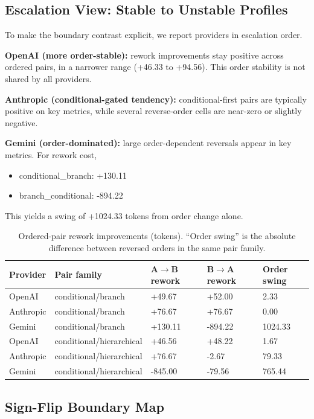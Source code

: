 \documentclass[11pt,a4paper]{article}
\begin{document}
\subsection{Escalation View: Stable to Unstable Profiles}

To make the boundary contrast explicit, we report providers in escalation order.

\textbf{OpenAI (more order-stable):}
rework improvements stay positive across ordered pairs, in a narrower range (+46.33 to +94.56).
This order stability is not shared by all providers.

\textbf{Anthropic (conditional-gated tendency):}
conditional-first pairs are typically positive on key metrics, while several reverse-order cells are near-zero or slightly negative.

\textbf{Gemini (order-dominated):}
large order-dependent reversals appear in key metrics. For rework cost,
\begin{itemize}
  \item conditional\_branch: +130.11
  \item branch\_conditional: -894.22
\end{itemize}
This yields a swing of +1024.33 tokens from order change alone.

\begin{table}[h]
\centering
\small
\begin{tabular}{lllll}
\toprule
Provider & Pair family & A$\rightarrow$B rework & B$\rightarrow$A rework & Order swing \\
\midrule
OpenAI & conditional/branch & +49.67 & +52.00 & 2.33 \\
Anthropic & conditional/branch & +76.67 & +76.67 & 0.00 \\
Gemini & conditional/branch & +130.11 & -894.22 & 1024.33 \\
\midrule
OpenAI & conditional/hierarchical & +46.56 & +48.22 & 1.67 \\
Anthropic & conditional/hierarchical & +76.67 & -2.67 & 79.33 \\
Gemini & conditional/hierarchical & -845.00 & -79.56 & 765.44 \\
\bottomrule
\end{tabular}
\caption{Ordered-pair rework improvements (tokens). ``Order swing'' is the absolute difference between reversed orders in the same pair family.}
\label{tab:combo_order_rework}
\end{table}

\subsection{Sign-Flip Boundary Map}
\end{document}
